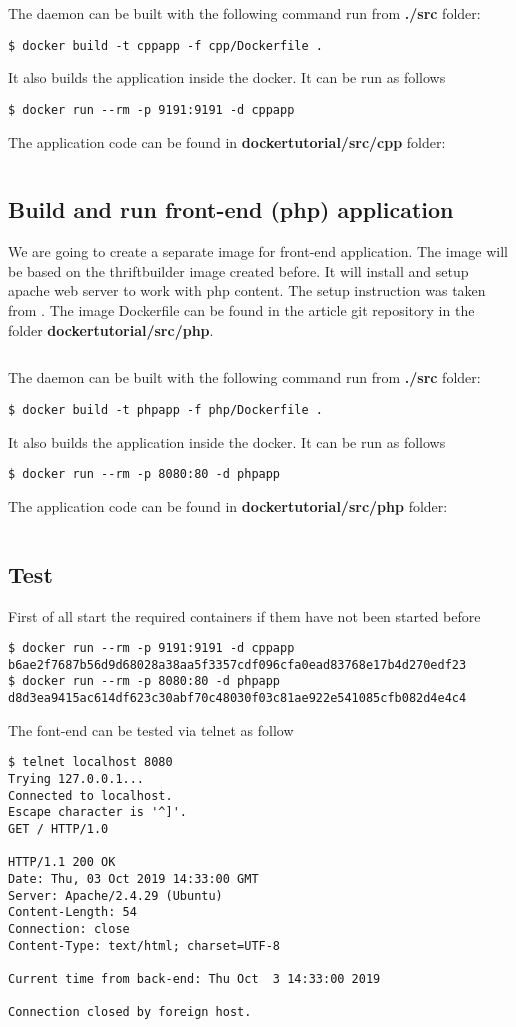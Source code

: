 \documentclass[14pt,a4paper]{article}
\begin{document}
The daemon can be built with the following command run from
\textbf{./src} folder:
\begin{verbatim}
$ docker build -t cppapp -f cpp/Dockerfile .
\end{verbatim}
It also builds the application inside the docker. It can be run as
follows
\begin{verbatim}
$ docker run --rm -p 9191:9191 -d cppapp
\end{verbatim}

The application code can be found in \textbf{dockertutorial/src/cpp} folder:
\inputminted{c++}{./src/cpp/main.cpp}


\subsection{Build and run front-end (php) application}
We are going to create a separate image for front-end application. The
image will be based on the thriftbuilder image created before.
It will install and setup apache web server to work with php content.
The setup instruction was taken from \cite{apache:php}.
The image Dockerfile can be found in the article git
repository \cite{github:articles_ivanmurashko} in the folder 
\textbf{dockertutorial/src/php}.
\inputminted{shell}{./src/php/Dockerfile}
The daemon can be built with the following command run from
\textbf{./src} folder:
\begin{verbatim}
$ docker build -t phpapp -f php/Dockerfile .
\end{verbatim}
It also builds the application inside the docker. It can be run as
follows
\begin{verbatim}
$ docker run --rm -p 8080:80 -d phpapp
\end{verbatim}

The application code can be found in \textbf{dockertutorial/src/php} folder:
\inputminted{php}{./src/php/index.php}

\subsection{Test}
First of all start the required containers if them have not been
started before
\begin{verbatim}
$ docker run --rm -p 9191:9191 -d cppapp
b6ae2f7687b56d9d68028a38aa5f3357cdf096cfa0ead83768e17b4d270edf23
$ docker run --rm -p 8080:80 -d phpapp
d8d3ea9415ac614df623c30abf70c48030f03c81ae922e541085cfb082d4e4c4
\end{verbatim}
The font-end can be tested via telnet as follow
\begin{verbatim}
$ telnet localhost 8080
Trying 127.0.0.1...
Connected to localhost.
Escape character is '^]'.
GET / HTTP/1.0

HTTP/1.1 200 OK
Date: Thu, 03 Oct 2019 14:33:00 GMT
Server: Apache/2.4.29 (Ubuntu)
Content-Length: 54
Connection: close
Content-Type: text/html; charset=UTF-8

Current time from back-end: Thu Oct  3 14:33:00 2019

Connection closed by foreign host.
\end{verbatim}

  
     
\end{document}

